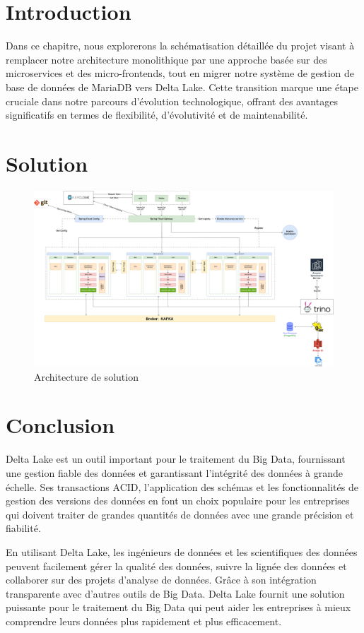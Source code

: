 \section*{Introduction}

Dans ce chapitre, nous explorerons la schématisation détaillée du projet visant à remplacer notre architecture monolithique par une approche basée sur des microservices et des micro-frontends, tout en migrer notre système de gestion de base de données de MariaDB vers Delta Lake. Cette transition marque une étape cruciale dans notre parcours d'évolution technologique, offrant des avantages significatifs en termes de flexibilité, d'évolutivité et de maintenabilité.

\section{Solution}

\begin{figure}[H]
\centering
\includegraphics[width=\linewidth]{images/architecture-solution.png}
\caption{Architecture de solution}\label{fig:solution}
\end{figure}

\section*{Conclusion}

Delta Lake est un outil important pour le traitement du Big Data, fournissant une gestion fiable des données et garantissant l'intégrité des données à grande échelle. Ses transactions ACID, l'application des schémas et les fonctionnalités de gestion des versions des données en font un choix populaire pour les entreprises qui doivent traiter de grandes quantités de données avec une grande précision et fiabilité.

En utilisant Delta Lake, les ingénieurs de données et les scientifiques des données peuvent facilement gérer la qualité des données, suivre la lignée des données et collaborer sur des projets d'analyse de données. Grâce à son intégration transparente avec d'autres outils de Big Data. Delta Lake fournit une solution puissante pour le traitement du Big Data qui peut aider les entreprises à mieux comprendre leurs données plus rapidement et plus efficacement.